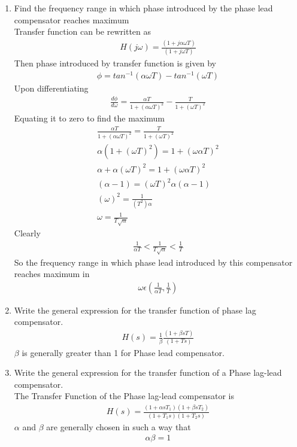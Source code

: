 \begin{enumerate}[label=\thesection.\arabic*.,ref=\thesection.\theenumi]
\item Find the frequency range in which phase introduced by the phase lead compensator reaches maximum \\
\solution  Transfer function can be rewritten as 
\begin{align}
    H(j\omega) = \frac{(1+ j \alpha \omega T)}{(1+j \omega T)}
\end{align}
Then phase introduced by transfer function is given by 
\begin{align}
    \phi = tan^{-1}(\alpha \omega T) - tan^{-1}(\omega T)
\end{align}
Upon differentiating
\begin{align}
    \frac{d\phi}{d\omega} = \frac{\alpha T}{1 + (\alpha \omega T)^2} - \frac{T}{1 + (\omega T)^2}
\end{align}
Equating it to zero to find the maximum
\begin{align}
    \frac{\alpha T}{1 + (\alpha \omega T)^2} = \frac{T}{1 + (\omega T)^2} \\
    \alpha(1 +(\omega T)^2) = 1 + (\omega \alpha T)^2 \\
    \alpha + \alpha(\omega T)^2 = 1 + (\omega \alpha T)^2 \\
    (\alpha - 1) = (\omega T)^2 \alpha(\alpha -1) \\
    (\omega)^2 = \frac{1}{(T^2) \alpha} \\ 
    \omega = \frac{1}{T \sqrt{\alpha}}
\end{align}
Clearly
\begin{align}
    \frac{1}{\alpha T} < \frac{1}{T \sqrt{\alpha}} < \frac{1}{T}
\end{align}
So the frequency range in which phase lead introduced by this compensator reaches maximum in 
\begin{align}
    \omega \epsilon (\frac{1}{\alpha T} , \frac{1}{T})    
\end{align}


\item Write the general expression for the transfer function of phase lag compensator. \\
\solution 
\begin{align}
    H(s) = \frac{1}{\beta}\frac{(1+ \beta s T)}{(1+T s)}
\end{align} 
$\beta$ is generally greater than 1 for Phase lead compensator.


\item
Write the general expression for the transfer function of a Phase lag-lead compensator. \\
\solution
The Transfer Function of the Phase lag-lead compensator is
\begin{align}
    H(s) = \frac{(1+ \alpha s T_1)(1+ \beta s T_2)}{(1+T_1 s)(1 + T_2 s)}
\end{align}
$\alpha$ and $\beta$ are generally chosen in such a way that
\begin{align}
    \alpha \beta = 1
\end{align}


\end{enumerate}
